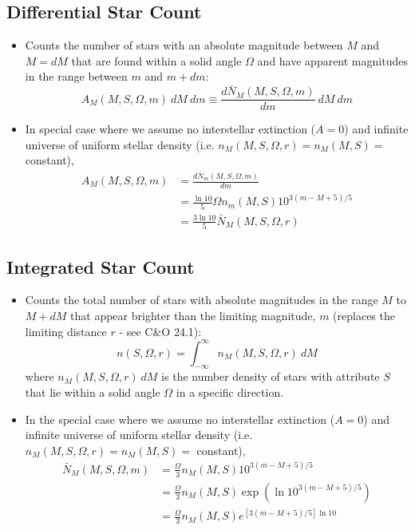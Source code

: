 \documentclass{book}
\begin{document}
\subsection{Differential Star Count}
\begin{itemize}
    \item Counts the number of stars with an absolute magnitude between $M$ and $M = dM$ that are found within a solid angle $\Omega$ and have apparent magnitudes in the range between $m$ and $m  + dm$:
          \begin{equation*}
              A_M (M, S, \Omega, m)\ dM\ dm \equiv \frac{d\bar{N}_M (M, S, \Omega, m)}{dm}\ dM\ dm \tag{C\&O 24.4}
          \end{equation*}
    \item In special case where we assume no interstellar extinction ($A=0$) and infinite universe of uniform stellar density (i.e. $n_M(M, S, \Omega, r) = n_M(M, S) = $ constant),
          \begin{align*}
              A_M (M, S, \Omega, m) & = \frac{d\bar{N}_m (M, S, \Omega, m)}{dm}                       \\
                                    & = \frac{\ln 10}{5} \Omega n_m (M, S) 10^{3(m - M +5)/5}         \\
                                    & = \frac{3 \ln 10}{5} \bar{N}_M(M, S, \Omega, r) \tag{C\&O 24.5}
          \end{align*}
\end{itemize}
\subsection{Integrated Star Count}
\begin{itemize}
    \item Counts the total number of stars with absolute magnitudes in the range $M$ to $M + dM$ that appear brighter than the limiting magnitude, $m$ (replaces the limiting distance $r$ - see C\&O 24.1):
          \begin{equation*}
              n(S, \Omega, r) = \int_{- \infty}^\infty n_M (M, S, \Omega, r)\ dM \tag{C\&O 24.2}
          \end{equation*}
          where $n_M (M, S, \Omega, r)\ dM$ is the number density of stars with attribute $S$ that lie within a solid angle $\Omega$ in a specific direction.
    \item In the special case where we assume no interstellar extinction ($A=0$) and infinite universe of uniform stellar density (i.e. $n_M(M, S, \Omega, r) = n_M(M, S) = $ constant),
          \begin{align*}
              \bar{N}_M (M, S, \Omega, m) & = \frac{\Omega}{3} n_M (M, S) 10^{3 (m - M + 5)/5}                        \\
                                          & = \frac{\Omega}{3} n_M (M, S) \exp\left( \ln 10^{3 (m - M + 5)/5} \right) \\
                                          & = \frac{\Omega}{3} n_M (M, S) e^{[3 (m - M + 5)/5]\ln 10}
          \end{align*}
\end{itemize}
\end{document}
